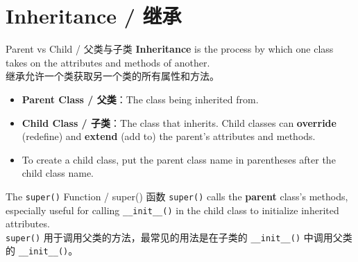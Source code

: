 \documentclass[11pt,a4paper]{article}
\begin{document}
\section{Inheritance / 继承}

\begin{concept}{Parent vs Child / 父类与子类}
    \textbf{Inheritance} is the process by which one class takes on the attributes and methods of another. \\
    继承允许一个类获取另一个类的所有属性和方法。

    \begin{itemize}[itemsep=0.5em]
        \item \textbf{Parent Class / 父类}：The class being inherited from.
        \item \textbf{Child Class / 子类}：The class that inherits. Child classes can \textbf{override} (redefine) and \textbf{extend} (add to) the parent's attributes and methods.
        \item To create a child class, put the parent class name in parentheses after the child class name.
    \end{itemize}
\end{concept}

\begin{concept}{The \texttt{super()} Function / super() 函数}
    \texttt{super()} calls the \textbf{parent} class's methods, especially useful for calling \texttt{\_\_init\_\_()} in the child class to initialize inherited attributes. \\
    \texttt{super()} 用于调用父类的方法，最常见的用法是在子类的 \texttt{\_\_init\_\_()} 中调用父类的 \texttt{\_\_init\_\_()}。
\end{concept}
\end{document}
